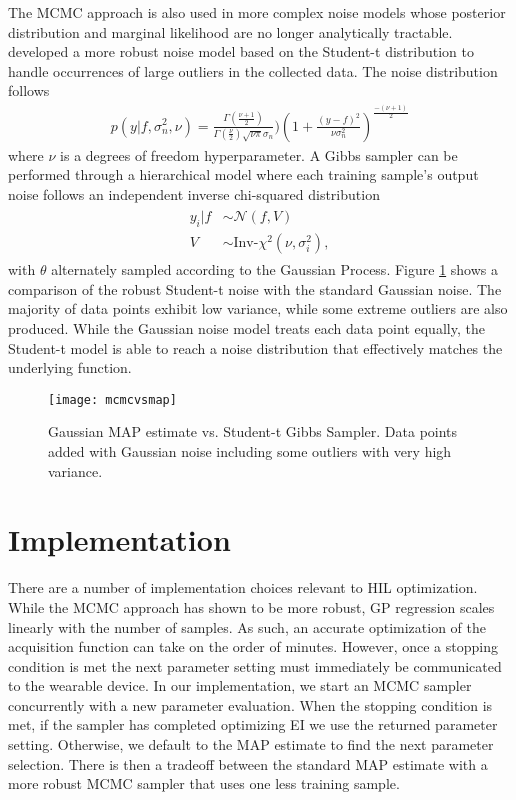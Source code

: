 The MCMC approach is also used in more complex noise models whose posterior distribution and marginal likelihood are no longer analytically tractable. \citet{NIPS2009_3806,Jylanki:2011:RGP:1953048.2078209} developed a more robust noise model based on the Student-t distribution to handle occurrences of large outliers in the collected data. The noise distribution follows
\begin{align}
p(y\vert f,\sigma_n^2,\nu) = \frac{\Gamma (\frac{\nu + 1}{2})}{\Gamma(\frac{\nu}{2})\sqrt{\nu\pi}\sigma_n})(1 + \frac{(y-f)^2}{\nu\sigma_n^2})^{\frac{-(\nu + 1)}{2}}
\end{align} 
where $\nu$ is a degrees of freedom hyperparameter. A Gibbs sampler can be performed through a hierarchical model where each training sample's output noise follows an independent inverse chi-squared distribution
\begin{align}
\begin{split}
y_i\vert f &\sim \mathcal{N}(f, V)\\
V &\sim \text{Inv-}\chi^2(\nu, \sigma_i^2),
\end{split}
\end{align}
with $\theta$ alternately sampled according to the Gaussian Process. Figure \ref{fig:mcmcvsmap} shows a comparison of the robust Student-t noise with the standard Gaussian noise. The majority of data points exhibit low variance, while some extreme outliers are also produced. While the Gaussian noise model treats each data point equally, the Student-t model is able to reach a noise distribution that effectively matches the underlying function.

\begin{figure}[t]
\centering
\texttt{[image: mcmcvsmap]}
\caption{Gaussian MAP estimate vs. Student-t Gibbs Sampler. Data points added with Gaussian noise including some outliers with very high variance.}
\label{fig:mcmcvsmap}
\end{figure}

\section{Implementation}
There are a number of implementation choices relevant to HIL optimization. While the MCMC approach has shown to be more robust, GP regression scales linearly with the number of samples. As such, an accurate optimization of the acquisition function can take on the order of minutes. However, once a stopping condition is met the next parameter setting must immediately be communicated to the wearable device. In our implementation, we start an MCMC sampler concurrently with a new parameter evaluation. When the stopping condition is met, if the sampler has completed optimizing EI we use the returned parameter setting. Otherwise, we default to the MAP estimate to find the next parameter selection. There is then a tradeoff between the standard MAP estimate with a more robust MCMC sampler that uses one less training sample.

